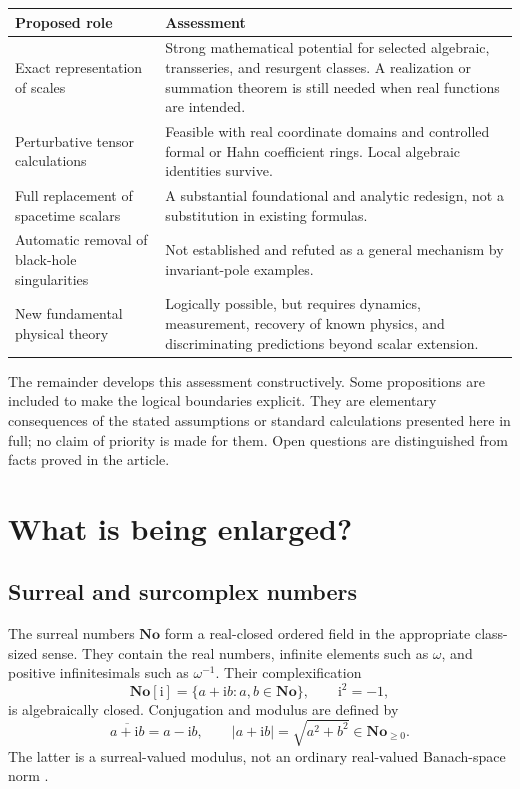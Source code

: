 \documentclass[11pt,letterpaper]{article}
\newcommand{\No}{\mathbf{No}}
\newcommand{\ii}{\mathrm{i}}
\theoremstyle{definition}
\theoremstyle{remark}
\begin{document}
\begin{center}
\small
\begin{tabular}{@{}P{0.26\textwidth}P{0.63\textwidth}@{}}
\toprule
Proposed role & Assessment \\
\midrule
Exact representation of scales & Strong mathematical potential for selected algebraic,
transseries, and resurgent classes. A realization or summation theorem is still needed
when real functions are intended. \\
Perturbative tensor calculations & Feasible with real coordinate domains and controlled
formal or Hahn coefficient rings. Local algebraic identities survive. \\
Full replacement of spacetime scalars & A substantial foundational and analytic redesign,
not a substitution in existing formulas. \\
Automatic removal of black-hole singularities & Not established and refuted as a general
mechanism by invariant-pole examples. \\
New fundamental physical theory & Logically possible, but requires dynamics, measurement,
recovery of known physics, and discriminating predictions beyond scalar extension. \\
\bottomrule
\end{tabular}
\end{center}

The remainder develops this assessment constructively. Some propositions are
included to make the logical boundaries explicit. They are elementary
consequences of the stated assumptions or standard calculations presented here
in full; no claim of priority is made for them. Open questions are distinguished
from facts proved in the article.

\section{What is being enlarged?}
\label{sec:scalars}

\subsection{Surreal and surcomplex numbers}

The surreal numbers $\No$ form a real-closed ordered field in the appropriate
class-sized sense. They contain the real numbers, infinite elements such as
$\omega$, and positive infinitesimals such as $\omega^{-1}$. Their
complexification
\[
 \No[\ii]=\{a+\ii b:a,b\in\No\},\qquad \ii^2=-1,
\]
is algebraically closed. Conjugation and modulus are defined by
\[
 \overline{a+\ii b}=a-\ii b,
 \qquad |a+\ii b|=\sqrt{a^2+b^2}\in\No_{\geq 0}.
\]
The latter is a surreal-valued modulus, not an ordinary real-valued Banach-space
norm \cite{Conway,Gonshor}.
\end{document}
